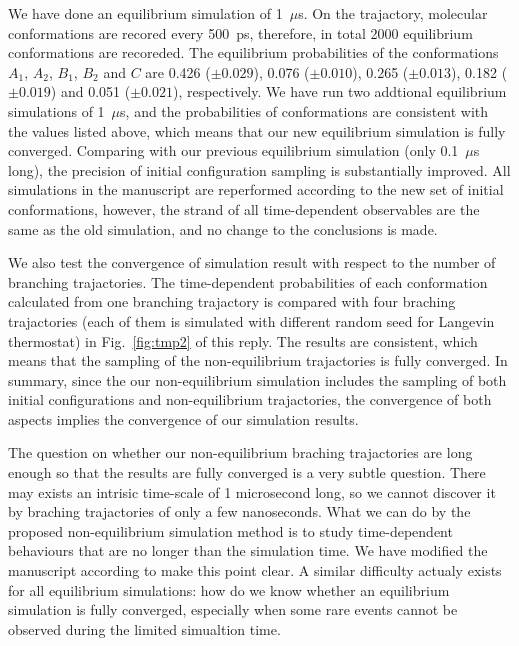 \documentclass[]{revtex4-1}
\begin{document}
We have done an equilibrium simulation of 1~$\mu$s.  On the
trajactory, molecular conformations are recored every 500~ps,
therefore, in total 2000 equilibrium conformations are recoreded.  The
equilibrium probabilities of the conformations $A_1$, $A_2$, $B_1$,
$B_2$ and $C$ are 0.426 ($\pm 0.029$), 0.076 ($\pm 0.010$), 0.265
($\pm 0.013$), 0.182 ($\pm 0.019$) and 0.051 ($\pm 0.021$),
respectively.  We have run two addtional equilibrium simulations of
1~$\mu$s, and the probabilities of conformations are consistent with
the values listed above, which means that our new equilibrium
simulation is fully converged.  Comparing with our previous
equilibrium simulation (only 0.1~$\mu$s long),
the precision
of initial configuration sampling is substantially improved. All
simulations in the manuscript are reperformed according to the new set
of initial conformations, however, the strand of all time-dependent
observables are the same as the old simulation, and no change to the
conclusions is made.

We also test the convergence of simulation result with respect to the
number of branching trajactories.  The time-dependent probabilities of
each conformation calculated from one branching trajactory is compared
with four braching trajactories (each of them is simulated with
different random seed for Langevin thermostat) in
Fig.~\ref{fig:tmp2} of this reply. The results are consistent, which means that the
sampling of the non-equilibrium trajactories is fully converged. In
summary, since the our non-equilibrium simulation includes the
sampling of both initial configurations and non-equilibrium
trajactories, the convergence of both aspects implies the convergence
of our simulation results.

The question on whether our non-equilibrium braching trajactories are
long enough so that the results are fully converged is a very subtle
question. There may exists an intrisic time-scale of 1 microsecond
long, so we cannot discover it by braching trajactories of only a few
nanoseconds.  What we can do by the proposed non-equilibrium simulation
method is to study time-dependent behaviours that are no longer than
the simulation time. We have modified the manuscript according to
make this point clear. A similar difficulty actualy exists for all equilibrium
simulations: how do we know whether an equilibrium simulation is fully converged,
especially when some rare events cannot be observed during the limited simualtion time.
\\
\end{document}

